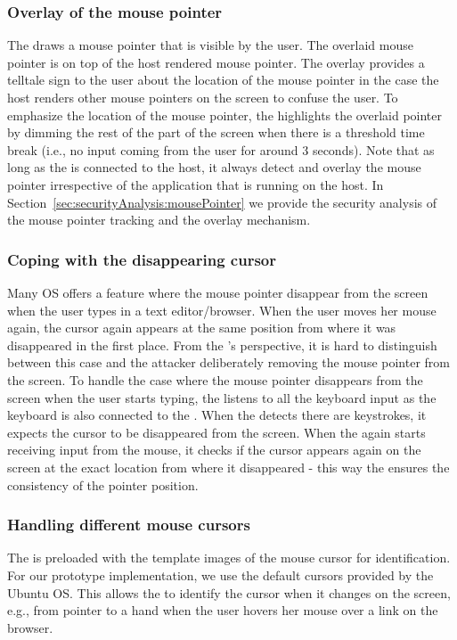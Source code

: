 \subsubsection{\bfseries Overlay of the mouse pointer} The \device draws a mouse pointer that is visible by the user. The overlaid mouse pointer is on top of the host rendered mouse pointer. The overlay provides a telltale sign to the user about the location of the mouse pointer in the case the host renders other mouse pointers on the screen to confuse the user. To emphasize the location of the mouse pointer, the \device highlights the overlaid pointer by dimming the rest of the part of the screen when there is a threshold time break (i.e., no input coming from the user for around 3 seconds). Note that as long as the \device is connected to the host, it always detect and overlay the mouse pointer irrespective of the application that is running on the host. In Section~\ref{sec:securityAnalysis:mousePointer} we provide the security analysis of the mouse pointer tracking and the overlay mechanism.


\subsubsection{\bfseries Coping with the disappearing cursor} Many OS offers a feature where the mouse pointer disappear from the screen when the user types in a text editor/browser. When the user moves her mouse again, the cursor again appears at the same position from where it was disappeared in the first place. From the \device's perspective, it is hard to distinguish between this case and the attacker deliberately removing the mouse pointer from the screen. To handle the case where the mouse pointer disappears from the screen when the user starts typing, the \device listens to all the keyboard input as the keyboard is also connected to the \device. When the \device detects there are keystrokes, it expects the cursor to be disappeared from the screen. When the \device again starts receiving input from the mouse, it checks if the cursor appears again on the screen at the exact location from where it disappeared - this way the \device ensures the consistency of the pointer position.  


\subsubsection{Handling different mouse cursors} The \device is preloaded with the template images of the mouse cursor for identification. For our \name prototype implementation, we use the default cursors provided by the Ubuntu OS. This allows the \device to identify the cursor when it changes on the screen, e.g., from pointer to a hand when the user hovers her mouse over a link on the browser. 



